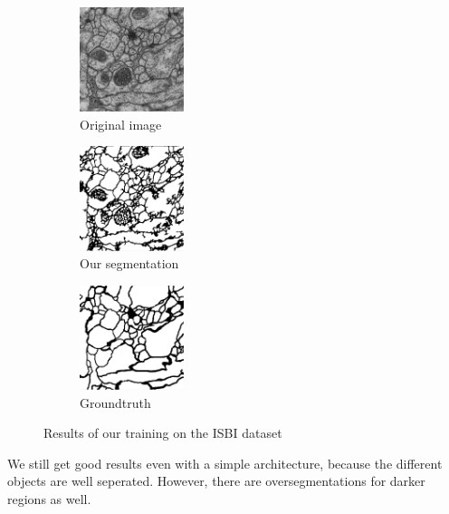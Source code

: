 \begin{figure}[!htbp]
    \centering
    \begin{subfigure}[t]{0.31\textwidth}
        \centering
        \includegraphics[height=1.2in]{./images/isbi_orig_1.png}
        \caption{Original image}
    \end{subfigure}%
    \begin{subfigure}[t]{0.31\textwidth}
        \centering
        \includegraphics[height=1.2in]{./images/isbi_out_1.png}
        \caption{Our segmentation}
    \end{subfigure}
    \begin{subfigure}[t]{0.31\textwidth}
        \centering
        \includegraphics[height=1.2in]{./images/isbi_gt_1.png}
        \caption{Groundtruth}
    \end{subfigure}
    \caption{Results of our training on the ISBI dataset}
\end{figure}

We still get good results even with a simple architecture, because the different objects are well seperated.
However, there are oversegmentations for darker regions as well.

